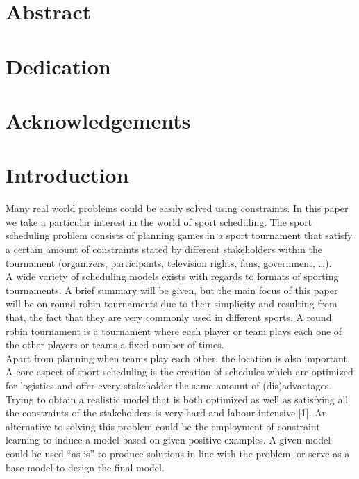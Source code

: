 \documentclass[12pt]{report}
\begin{document}



\chapter*{Abstract}
\chapter*{Dedication}
\chapter*{Acknowledgements}

\tableofcontents

\chapter{Introduction}
Many real world problems could be easily solved using constraints. In this paper we take a particular interest in the world of sport scheduling. The sport scheduling problem consists of planning games in a sport tournament that satisfy a certain amount of constraints stated by different stakeholders within the tournament (organizers, participants, television rights, fans, government, …).
\\[5px]
A wide variety of scheduling models exists with regards to formats of sporting tournaments. A brief summary will be given, but the main focus of this paper will be on round robin tournaments due to their simplicity and resulting from that, the fact that they are very commonly used in different sports. A round robin tournament is a tournament where each player or team plays each one of the other players or teams a fixed number of times.
\\[5px]
Apart from planning when teams play each other, the location is also important. A core aspect of sport scheduling is the creation of schedules which are optimized for logistics and offer every stakeholder the same amount of (dis)advantages.
\\[5px]
Trying to obtain a realistic model that is both optimized as well as satisfying all the constraints of the stakeholders is very hard and labour-intensive [1]. An alternative to solving this problem could be the employment of constraint learning to induce a model based on given positive examples. A given model could be used “as is” to produce solutions in line with the problem, or serve as a base model to design the final model.
\\[5px]
\end{document}
